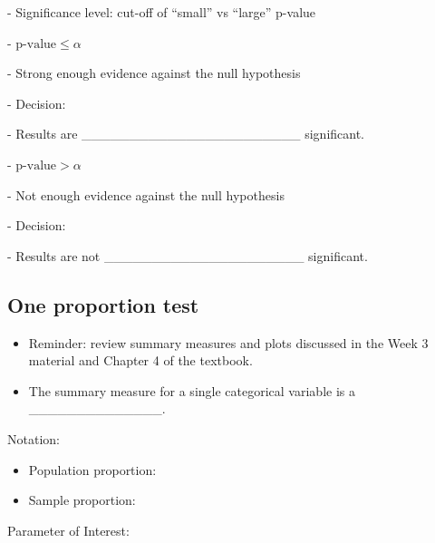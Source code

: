 \documentclass[
]{report}
\newcommand{\rgi}{\hspace{24pt}}  %
\begin{document}
\rgi - Significance level: cut-off of ``small'' vs ``large'' p-value

\rgi \rgi - \(\text{p-value} \le \alpha\)

\rgi \rgi \rgi - Strong enough evidence against the null hypothesis

\rgi \rgi \rgi - Decision:

\vspace{0.2in}

\rgi \rgi \rgi - Results are \_\_\_\_\_\_\_\_\_\_\_\_\_\_\_\_\_\_\_\_\_\_\_ significant.

\rgi \rgi - \(\text{p-value} > \alpha\)

\rgi \rgi \rgi - Not enough evidence against the null hypothesis

\rgi \rgi \rgi - Decision:

\vspace{0.17in}

\rgi \rgi \rgi - Results are not \_\_\_\_\_\_\_\_\_\_\_\_\_\_\_\_\_\_\_\_\_ significant.


\subsection*{One proportion test}\label{one-proportion-test}

\begin{itemize}
\item
  Reminder: review summary measures and plots discussed in the Week 3 material and Chapter 4 of the textbook.
\item
  The summary measure for a single categorical variable is a \_\_\_\_\_\_\_\_\_\_\_\_\_\_.
\end{itemize}

Notation:

\begin{itemize}
\item
  Population proportion:
\item
  Sample proportion:
\end{itemize}

Parameter of Interest:
\end{document}
